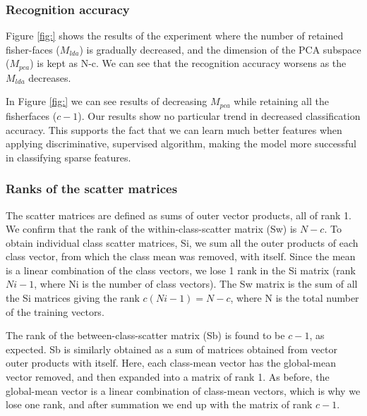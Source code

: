 \documentclass[10pt,technote]{IEEEtran}
\begin{document}
\subsubsection{Recognition accuracy}
Figure \ref{fig:} shows the results of the experiment where the number of retained fisher-faces ($M_{lda}$) is gradually decreased, and the dimension of the PCA subspace ($M_{pca}$) is kept as N-c. We can see that the recognition accuracy worsens as the $M_{lda}$ decreases.

In Figure \ref{fig:} we can see results of decreasing $M_{pca}$ while retaining all the fisherfaces ($c-1$).
Our results show no particular trend in decreased classification accuracy. This supports the fact that we can learn much better features when applying discriminative, supervised algorithm, making the model more successful in classifying sparse features.



\subsubsection{Ranks of the scatter matrices}
The scatter matrices are defined as sums of outer vector products, all of rank 1.
We confirm that the rank of the within-class-scatter matrix (Sw) is $N - c$. To obtain individual class scatter matrices, Si, we sum all the outer products of each class vector, from which the class mean was removed, with itself. Since the mean is a linear combination of the class vectors, we lose 1 rank in the Si matrix (rank $Ni - 1$, where Ni is the number of class vectors). The Sw matrix is the sum of all the Si matrices giving the rank $c(Ni - 1) = N - c$, where N is the total number of the training vectors.

The rank of the between-class-scatter matrix (Sb) is found to be $c - 1$, as expected. Sb is similarly obtained as a sum of matrices obtained from vector outer products with itself. Here, each class-mean vector has the global-mean vector removed, and then expanded into a matrix of rank 1. As before, the global-mean vector is a linear combination of class-mean vectors, which is why we lose one rank, and after summation we end up with the matrix of rank $c - 1$.
\end{document}
